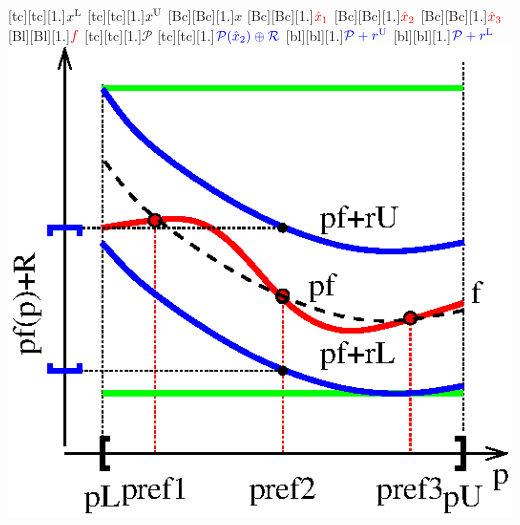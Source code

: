\documentclass[a4paper,12pt]{article}
\begin{document}
[tc][tc][1.]{$x^{\rm L}$}
[tc][tc][1.]{$x^{\rm U}$}
[Bc][Bc][1.]{$x$}
[Bc][Bc][1.]{$\color{red}\hat{x}_1$}
[Bc][Bc][1.]{$\color{red}\hat{x}_2$}
[Bc][Bc][1.]{$\color{red}\hat{x}_3$}
[Bl][Bl][1.]{$\color{red}f$}
[tc][tc][1.]{$\mathcal P$}
[tc][tc][1.]{$\color{blue}\mathcal P(\hat x_2)\oplus\mathcal R$}
[bl][bl][1.]{$\color{blue}\mathcal P+r^{\rm U}$}
[bl][bl][1.]{$\color{blue}\mathcal P+r^{\rm L}$}
\includegraphics[width=.45\textwidth]{Chebyshevmodel.eps}
\end{document}
